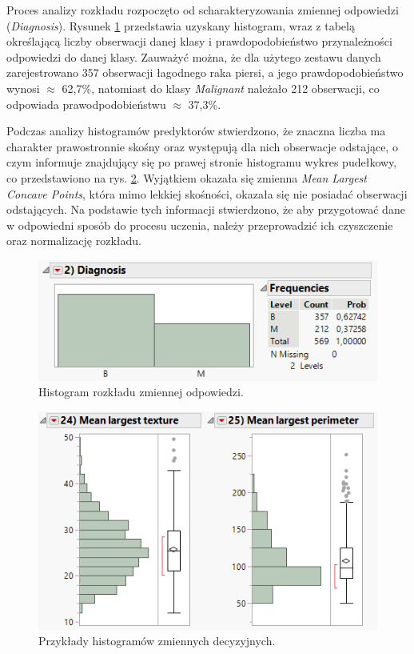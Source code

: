 	Proces analizy rozkładu rozpoczęto od scharakteryzowania zmiennej odpowiedzi (\textit{Diagnosis}). Rysunek \ref{fig:diagnosisdistribution} przedstawia uzyskany histogram, wraz z tabelą określającą liczby obserwacji danej klasy i prawdopodobieństwo przynależności odpowiedzi do danej klasy. Zauważyć można, że dla użytego zestawu danych zarejestrowano 357 obserwacji łagodnego raka piersi, a jego prawdopodobieństwo wynosi $\approx$ 62,7\%, natomiast do klasy \textit{Malignant} należało 212 obserwacji, co odpowiada prawodpodobieństwu $\approx$ 37,3\%.
		
	Podczas analizy histogramów predyktorów stwierdzono, że znaczna liczba ma charakter prawostronnie skośny oraz występują dla nich obserwacje odstające, o czym informuje znajdujący się po prawej stronie histogramu wykres pudełkowy, co przedstawiono na rys. \ref{fig:variabledistribution}. Wyjątkiem okazała się zmienna \textit{Mean Largest Concave Points}, która mimo lekkiej skośności, okazała się nie posiadać obserwacji odstających. Na podstawie tych informacji stwierdzono, że aby przygotować dane w odpowiedni sposób do procesu uczenia, należy przeprowadzić ich czyszczenie oraz normalizację rozkładu.
	
	\begin{figure}[!ht]
		\centering
		\includegraphics[width=0.6\linewidth]{Rysunki/Rozdzial2/diagnosis_distribution}
		\caption{Histogram rozkładu zmiennej odpowiedzi.}
		\label{fig:diagnosisdistribution}
	\end{figure}
	
	\begin{figure}[!ht]
		\centering
		\includegraphics[width=0.6\linewidth]{Rysunki/Rozdzial2/variable_distribution}
		\caption{Przykłady histogramów zmiennych decyzyjnych.}
		\label{fig:variabledistribution}
	\end{figure}
	
